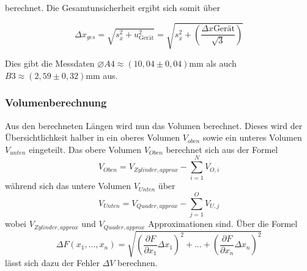 berechnet. Die Gesamtunsicherheit ergibt sich somit über

\begin{equation}
	\label{eq:abweich_mittelwert_pm}
	\Delta x_{ges} = \sqrt{s_{\overline{x}}^2 + u_{\text{Gerät}}^2} =  \sqrt{s_{\overline{x}}^2 + ({\frac{\Delta x{\text{Gerät}}}{\sqrt{3}}})}
\end{equation}

Dies gibt die Messdaten $\varnothing A4 \approx (10,04\pm0,04)\unit{\mm}$ als auch $B3 \approx (2,59\pm0,32)\unit{\mm}$ aus.

\subsubsection{Volumenberechnung}
Aus den berechneten Längen wird nun das Volumen berechnet. Dieses wird der Übersichtlichkeit halber in ein oberes Volumen $V_{oben}$ sowie ein unteres Volumen $V_{unten}$ eingeteilt.
Das obere Volumen $V_{Oben}$ berechnet sich aus der Formel
\begin{equation}
	\label{eq:v_oben}
	V_{Oben} = V_{Zylinder,approx} - \sum_{i=1}^{N} V_{O,i}
\end{equation}
während sich das untere Volumen $V_{Unten}$ über
\begin{equation}
	\label{eq:v_unten}
	V_{Unten} = V_{Quader,approx} - \sum_{j=1}^{O} V_{U,j}
\end{equation}
wobei $V_{Zylinder,approx}$ und $V_{Quader,approx}$ Approximationen sind. Über die Formel
\begin{equation}
	\label{eq:fehler}
	\Delta F(x_1,...,x_n) = \sqrt{(\frac{\partial F}{\partial x_1}\Delta x_1)^2+...+(\frac{\partial F}{\partial x_n}\Delta x_n)^2}
\end{equation}
lässt sich dazu der Fehler $\Delta V$ berechnen.

